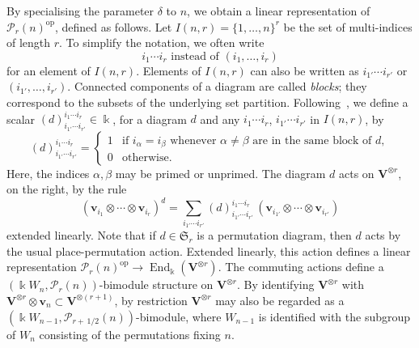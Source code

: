 \documentclass[ALCO,ThmDefs,Unicode,epreuves]{cedram}
\DeclareMathOperator{\End}{End}
\DeclareMathOperator{\op}{op}
\newcommand{\Sym}{\mathfrak{S}}
\newcommand{\Ptn}{\mathcal{P}}
\newcommand{\V}{\mathbf{V}} %
\newcommand{\bv}{\mathbf{v}} %
\newcommand{\half}{\, 1/2} %
\begin{document}
By specialising the parameter $\delta$ to $n$, we obtain a linear
representation of $\Ptn_r(n)^{\op}$, defined as follows. Let $I(n,r) =
\{1, \dots, n\}^r$ be the set of multi-indices of length $r$. To
simplify the notation, we often write
\[
 \text{$i_1 \cdots i_r$ instead of $(i_1, \dots, i_r)$}
\]
for an element of $I(n,r)$. Elements of $I(n,r)$ can also be written
as $i_{1'} \cdots i_{r'}$ or $(i_{1'}, \dots, i_{r'})$. Connected
components of a diagram are called \emph{blocks}; they correspond to
the subsets of the underlying set partition. Following~\cite{HR-2005},
we define a scalar $(d)^{i_1 \cdots i_r}_{i_{1'} \cdots i_{r'}} \in
\Bbbk$, for a diagram $d$ and any $i_1 \cdots i_r$, $i_{1'} \cdots
i_{r'}$ in $I(n,r)$, by
\[
(d)^{i_1 \cdots i_r}_{i_{1'} \cdots i_{r'}} = 
\begin{cases}
 1 & \text{if } i_\alpha = i_\beta \text{ whenever } \alpha \ne
 \beta \text{ are in the same block of } d,\\ 
 0 & \text{otherwise}.
\end{cases}
\]
Here, the indices $\alpha,\beta$ may be primed or unprimed. The
diagram $d$ acts on $\V^{\otimes r}$, on the right, by the rule
\begin{equation}\label{eq:Ptn-action}
(\bv_{i_1} \otimes \cdots \otimes \bv_{i_r})^d = \sum_{i_{1'} \cdots
 i_{r'}} (d)^{i_1 \cdots i_r}_{i_{1'} \cdots i_{r'}} \, (\bv_{i_{1'}}
 \otimes \cdots \otimes \bv_{i_{r'}})
\end{equation}
extended linearly. Note that if $d \in \Sym_r$ is a permutation
diagram, then $d$ acts by the usual place-permutation action. Extended
linearly, this action defines a linear representation $\Ptn_r(n)^{\op}
\to \End_\Bbbk(\V^{\otimes r})$. The commuting actions define a
$(\Bbbk W_n, \Ptn_r(n))$-bimodule structure on $\V^{\otimes r}$. By
identifying $\V^{\otimes r}$ with $\V^{\otimes r} \otimes \bv_n
\subset \V^{\otimes (r+1)}$, by restriction $\V^{\otimes r}$ may also
be regarded as a $(\Bbbk W_{n-1}, \Ptn_{r+\half}(n))$-bimodule, where
$W_{n-1}$ is identified with the subgroup of $W_n$ consisting of the
permutations fixing $n$.
\end{document}
